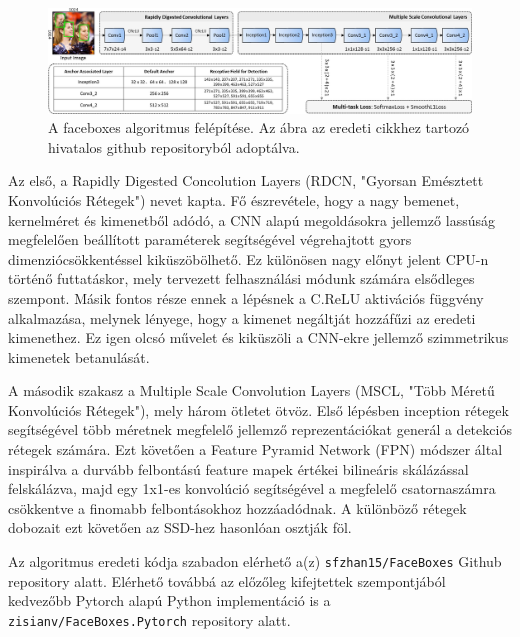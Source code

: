 \begin{figure}[h]
    \centering
    \includegraphics[width=\linewidth]{figures/faceboxes_framework.jpg}
    \caption{A faceboxes algoritmus felépítése. Az ábra az eredeti cikkhez\cite{zhang_faceboxes_2018} tartozó hivatalos github repositoryból\cite{zhang_faceboxes_2021} adoptálva.}
    \label{fig:faceboxes}
\end{figure}

Az első, a Rapidly Digested Concolution Layers (RDCN, "Gyorsan Emésztett Konvolúciós Rétegek") nevet kapta. Fő észrevétele, hogy a nagy bemenet, kernelméret és kimenetből adódó, a CNN alapú megoldásokra jellemző lassúság megfelelően beállított paraméterek segítségével végrehajtott gyors dimenziócsökkentéssel kiküszöbölhető. Ez különösen nagy előnyt jelent CPU-n történő futtatáskor, mely tervezett felhasználási módunk számára elsődleges szempont. Másik fontos része ennek a lépésnek a C.ReLU \cite{shang_understanding_2016} aktivációs függvény alkalmazása, melynek lényege, hogy a kimenet negáltját hozzáfűzi az eredeti kimenethez. Ez igen olcsó művelet és kiküszöli a CNN-ekre jellemző szimmetrikus kimenetek betanulását.

A második szakasz a Multiple Scale Convolution Layers (MSCL, "Több Méretű Konvolúciós Rétegek"), mely három ötletet ötvöz. Első lépésben inception \cite{szegedy_going_2015} rétegek segítségével több méretnek megfelelő jellemző reprezentációkat generál a detekciós rétegek számára. Ezt követően a Feature Pyramid Network (FPN) \cite{lin_feature_2017} módszer által inspirálva a durvább felbontású feature mapek értékei bilineáris skálázással felskálázva, majd egy 1x1-es konvolúció segítségével a megfelelő csatornaszámra csökkentve a finomabb felbontásokhoz hozzáadódnak. A különböző rétegek dobozait ezt követően az SSD-hez \cite{liu_ssd_2016} hasonlóan osztják föl.

Az algoritmus eredeti kódja szabadon elérhető a(z) \lstinline{sfzhan15/FaceBoxes} \cite{zhang_faceboxes_2021} Github repository alatt. Elérhető továbbá az előzőleg kifejtettek szempontjából kedvezőbb Pytorch alapú Python implementáció is a \lstinline{zisianv/FaceBoxes.Pytorch} \cite{wong_faceboxes_2021} repository alatt.

